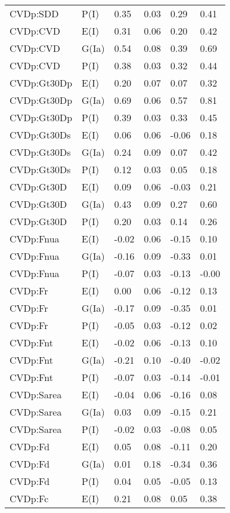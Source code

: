 \begin{center}
\begin{longtable}{|p{1.1in}|p{0.7in}|p{0.7in}|p{0.6in}|p{0.6in}|p{0.6in}|}
  CVDp:SDD & P(I) & 0.35 & 0.03 & 0.29 & 0.41 \\ 
  CVDp:CVD & E(I) & 0.31 & 0.06 & 0.20 & 0.42 \\ 
  CVDp:CVD & G(Ia) & 0.54 & 0.08 & 0.39 & 0.69 \\ 
  CVDp:CVD & P(I) & 0.38 & 0.03 & 0.32 & 0.44 \\ 
  CVDp:Gt30Dp & E(I) & 0.20 & 0.07 & 0.07 & 0.32 \\ 
  CVDp:Gt30Dp & G(Ia) & 0.69 & 0.06 & 0.57 & 0.81 \\ 
  CVDp:Gt30Dp & P(I) & 0.39 & 0.03 & 0.33 & 0.45 \\ 
  CVDp:Gt30Ds & E(I) & 0.06 & 0.06 & -0.06 & 0.18 \\ 
  CVDp:Gt30Ds & G(Ia) & 0.24 & 0.09 & 0.07 & 0.42 \\ 
  CVDp:Gt30Ds & P(I) & 0.12 & 0.03 & 0.05 & 0.18 \\ 
  CVDp:Gt30D & E(I) & 0.09 & 0.06 & -0.03 & 0.21 \\ 
  CVDp:Gt30D & G(Ia) & 0.43 & 0.09 & 0.27 & 0.60 \\ 
  CVDp:Gt30D & P(I) & 0.20 & 0.03 & 0.14 & 0.26 \\ 
  CVDp:Fnua & E(I) & -0.02 & 0.06 & -0.15 & 0.10 \\ 
  CVDp:Fnua & G(Ia) & -0.16 & 0.09 & -0.33 & 0.01 \\ 
  CVDp:Fnua & P(I) & -0.07 & 0.03 & -0.13 & -0.00 \\ 
  CVDp:Fr & E(I) & 0.00 & 0.06 & -0.12 & 0.13 \\ 
  CVDp:Fr & G(Ia) & -0.17 & 0.09 & -0.35 & 0.01 \\ 
  CVDp:Fr & P(I) & -0.05 & 0.03 & -0.12 & 0.02 \\ 
  CVDp:Fnt & E(I) & -0.02 & 0.06 & -0.13 & 0.10 \\ 
  CVDp:Fnt & G(Ia) & -0.21 & 0.10 & -0.40 & -0.02 \\ 
  CVDp:Fnt & P(I) & -0.07 & 0.03 & -0.14 & -0.01 \\ 
  CVDp:Sarea & E(I) & -0.04 & 0.06 & -0.16 & 0.08 \\ 
  CVDp:Sarea & G(Ia) & 0.03 & 0.09 & -0.15 & 0.21 \\ 
  CVDp:Sarea & P(I) & -0.02 & 0.03 & -0.08 & 0.05 \\ 
  CVDp:Fd & E(I) & 0.05 & 0.08 & -0.11 & 0.20 \\ 
  CVDp:Fd & G(Ia) & 0.01 & 0.18 & -0.34 & 0.36 \\ 
  CVDp:Fd & P(I) & 0.04 & 0.05 & -0.05 & 0.13 \\ 
  CVDp:Fc & E(I) & 0.21 & 0.08 & 0.05 & 0.38 \\ 

\end{longtable}
\end{center}
